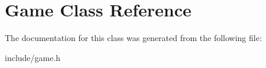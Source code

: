\hypertarget{class_game}{}\section{Game Class Reference}
\label{class_game}


The documentation for this class was generated from the following file\+:\begin{DoxyCompactItemize}
\item 
include/game.\+h\end{DoxyCompactItemize}
